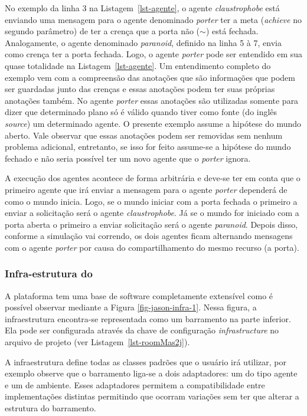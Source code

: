 No exemplo da linha 3 na Listagem~\ref{lst-agente}, o agente
\emph{claustrophobe} está enviando uma mensagem para o agente denominado
\emph{porter} ter a meta (\emph{achieve} no segundo parâmetro) de ter a crença
que a porta não ($\sim$) está fechada. Analogamente, o agente denominado
\emph{paranoid}, definido na linha 5 à 7, envia como crença ter a porta
fechada. Logo, o agente \emph{porter} pode ser entendido em sua quase
totalidade na Listagem~\ref{lst-agente}. Um entendimento completo do exemplo
vem com a compreensão das anotações que são informações que podem ser
guardadas junto das crenças e essas anotações podem ter suas próprias
anotações também. No agente \emph{porter} essas anotações são utilizadas
somente para dizer que determinado plano só é válido quando tiver como fonte
(do inglês \emph{source}) um determinado agente. O presente exemplo assume a
hipótese do mundo aberto. Vale observar que essas anotações podem ser
removidas sem nenhum problema adicional, entretanto, se isso for feito
assume-se a hipótese do mundo fechado e não seria possível ter um novo agente
que o \emph{porter} ignora.

A execução dos agentes acontece de forma arbitrária e deve-se ter em conta
que o primeiro agente que irá enviar a mensagem para o agente \emph{porter} dependerá
de como o mundo inicia. Logo, se o mundo iniciar com a porta fechada o primeiro
a enviar a solicitação será o agente \emph{claustrophobe}. Já se o mundo for iniciado
com a porta aberta o primeiro a enviar solicitação será o agente \emph{paranoid}.
Depois disso, conforme a simulação vai correndo, os dois agentes ficam alternando
mensagens com o agente \emph{porter} por causa do compartilhamento do mesmo
recurso (a porta).

\vfill

\subsubsection{Infra-estrutura do \jason} \label{sec-jason-architecture}

A plataforma \jason tem uma base de software completamente extensível como
é possível observar mediante a Figura \ref{fig-jason-infra-1}.
Nessa figura, a infraestrutura encontra-se representada como um barramento
na parte inferior. Ela pode ser configurada através da chave de configuração
\emph{infrastructure} no arquivo de projeto (ver Listagem~\ref{lst-roomMas2j}).

A infraestrutura define todas as classes padrões que o usuário irá utilizar,
por exemplo observe que o barramento liga-se a dois adaptadores: um do tipo
agente e um de ambiente. Esses adaptadores permitem a compatibilidade entre
implementações distintas permitindo que ocorram variações sem ter que alterar
a estrutura do barramento.

